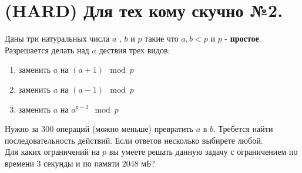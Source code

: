 \documentclass[10pt]{article}
\begin{document}
    \section{(HARD) Для тех кому скучно №2.}
    Даны три натуральных числа $a$ , $b$ и $p$ такие что $a , b < p$ и $p$ -  \textbf{простое}.
    Разрешается делать над $a$ дествия трех видов:
    \begin{enumerate} 
        \item заменить $a$ на $(a + 1)\mod p$
        \item заменить $a$ на $(a - 1)\mod p$
        \item заменить $a$ на $a ^ {p -2}\mod p$
    \end{enumerate}
    Нужно за $300$ операций (можно меньше) превратить $a$ в $b$. Требется найти последовательность действий.
    Если ответов несколько выбирете любой.
    \\
    Для каких ограничений на $p$ вы умеете решать данную задачу с ограничением по времени 3 секунды и по памяти 2048 мБ?
    \\
    \\
    
    
\end{document}

